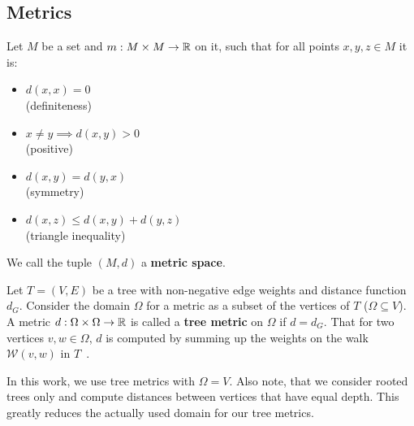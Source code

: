 \subsection{Metrics} \label{subsec:def_metrics}

	Let $M$ be a set and $m:M\times M\to\mathbb{R}$ on it, such that for all points $x, y, z\in M$ it is:
	\begin{multicols}{2}
	\begin{itemize}
		\item $d(x,x) = 0$\\(definiteness)
		\item $x\neq y \implies d(x,y)>0$\\(positive)
		
		\item $d(x,y)=d(y,x)$\\(symmetry)
		\item $d(x,z) \le d(x,y) + d(y,z)$\\(triangle inequality)
	\end{itemize}
	\end{multicols}
	We call the tuple $(M,d)$ a \textbf{metric space}.
	
	Let $T=(V, E)$ be a tree with non-negative edge weights and distance function $d_G$.
	Consider the domain $\Omega$ for a metric as a subset of the vertices of $T$ ($\Omega \subseteq V$).
	A metric $d:\Omega\times\Omega\to\mathbb{R}$ is called a \textbf{tree metric} on $\Omega$ if $d=d_G$.
	That for two vertices $v, w\in\Omega$, $d$ is computed by summing up the weights on the walk $\mathcal{W}(v, w)$ in $T$~\cite{2019_Le_NIPS}. %
	
	In this work, we use tree metrics with $\Omega=V$.
	Also note, that we consider rooted trees only and compute distances between vertices that have equal depth.
	This greatly reduces the actually used domain for our tree metrics.
	
